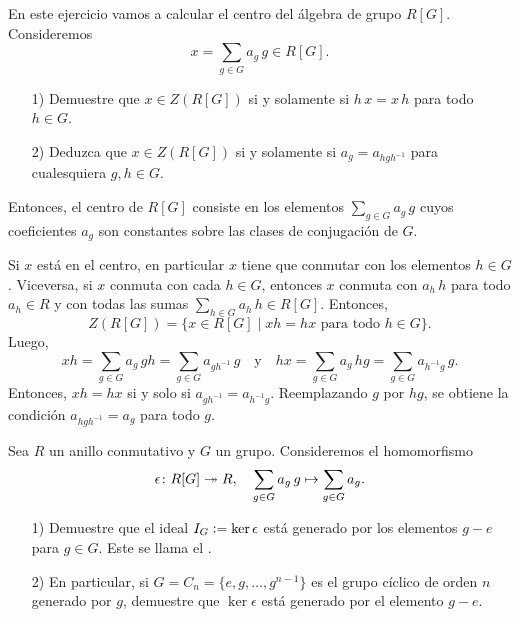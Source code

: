 \begin{ejercicio}
  \label{ejerc:centro-de-RG}
  En este ejercicio vamos a calcular el centro del álgebra de grupo
  $R [G]$. Consideremos
  $$x = \sum_{g\in G} a_g\,g \in R [G].$$

  \begin{enumerate}
  \item[1)] Demuestre que $x \in Z (R [G])$ si y solamente si $h\,x = x\,h$ para
    todo $h\in G$.

  \item[2)] Deduzca que $x\in Z (R [G])$ si y solamente si $a_g = a_{hgh^{-1}}$
    para cualesquiera $g,h\in G$.
  \end{enumerate}

  Entonces, el centro de $R [G]$ consiste en los elementos
  $\sum_{g\in G} a_g\,g$ cuyos coeficientes $a_g$ son constantes sobre
  las clases de conjugación de $G$.

  \ifdefined\solutions
  \begin{solucion}
    Si $x$ está en el centro, en particular $x$ tiene que conmutar con
    los elementos $h \in G$. Viceversa, si $x$ conmuta con cada $h\in G$,
    entonces $x$ conmuta con $a_h\,h$ para todo $a_h\in R$ y con todas las sumas
    $\sum_{h\in G} a_h\,h \in R [G]$. Entonces,
    $$Z (R [G]) = \{ x \in R [G] \mid xh = hx \text{ para todo }h\in G \}.$$
    Luego,
    \[ xh = \sum_{g\in G} a_g\,gh = \sum_{g\in G} a_{gh^{-1}}\,g
       \quad\text{y}\quad
       hx = \sum_{g\in G} a_g\,hg = \sum_{g\in G} a_{h^{-1}g}\,g. \]
    Entonces, $xh = hx$ si y solo si $a_{gh^{-1}} = a_{h^{-1}g}$. Reemplazando
    $g$ por $hg$, se obtiene la condición $a_{hgh^{-1}} = a_g$ para todo $g$.
  \end{solucion}
  \fi
\end{ejercicio}

\begin{ejercicio}
  Sea $R$ un anillo conmutativo y $G$ un grupo. Consideremos el homomorfismo
  \[ \epsilon\colon R [G] \twoheadrightarrow R,
     \quad
     \sum_{g\in G} a_g\,g \mapsto \sum_{g\in G} a_g. \]

  \begin{enumerate}
  \item[1)] Demuestre que el ideal $I_G \mathrel{\mathop:}= \ker \epsilon$ está generado por
    los elementos $g-e$ para $g\in G$. Este se llama el .

  \item[2)] En particular, si $G = C_n = \{ e, g, \ldots, g^{n-1} \}$ es
    el grupo cíclico de orden $n$ generado por $g$, demuestre que
    $\ker \epsilon$ está generado por el elemento $g-e$.
  \end{enumerate}
\end{ejercicio}

